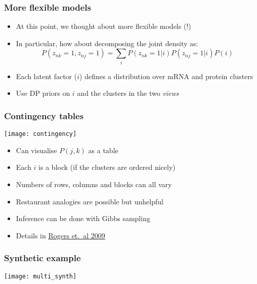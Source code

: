 \begin{frame}
	\frametitle{More flexible models}
	\begin{itemize}
		\item At this point, we thought about more flexible models (!)
		\item In particular, how about decomposing the joint density as:
		\[
			P(z_{nk}=1,z_{nj}=1) = \sum_i P(z_{nk}=1|i)P(z_{nj}=1|i)P(i)
		\]
		\item Each latent factor ($i$) defines a distribution over mRNA and protein clusters
		\item Use DP priors on $i$ and the clusters in the two \emph{views}
	\end{itemize}
\end{frame}

\begin{frame}
	\frametitle{Contingency tables}
	\begin{multicols}{2}
		\texttt{[image: contingency]}
	\newpage
	\begin{itemize}
		\item Can visualise $P(j,k)$ as a table
		\item Each $i$ is a block (if the clusters are ordered nicely)
		\item Numbers of rows, columns and blocks can all vary
		\item Restaurant analogies are possible but unhelpful
	\end{itemize}
	\end{multicols}
	\begin{itemize}
		\item Inference can be done with Gibbs sampling
		\item Details in \href{http://eprints.gla.ac.uk/5369/1/5369.pdf}{Rogers et.~al 2009}
	\end{itemize}
\end{frame}

\begin{frame}
	\frametitle{Synthetic example}
	\texttt{[image: multi\_synth]}
\end{frame}

